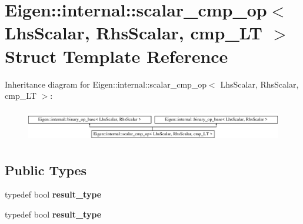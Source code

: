 \hypertarget{struct_eigen_1_1internal_1_1scalar__cmp__op_3_01_lhs_scalar_00_01_rhs_scalar_00_01cmp___l_t_01_4}{}\section{Eigen\+:\+:internal\+:\+:scalar\+\_\+cmp\+\_\+op$<$ Lhs\+Scalar, Rhs\+Scalar, cmp\+\_\+\+LT $>$ Struct Template Reference}
\label{struct_eigen_1_1internal_1_1scalar__cmp__op_3_01_lhs_scalar_00_01_rhs_scalar_00_01cmp___l_t_01_4}
Inheritance diagram for Eigen\+:\+:internal\+:\+:scalar\+\_\+cmp\+\_\+op$<$ Lhs\+Scalar, Rhs\+Scalar, cmp\+\_\+\+LT $>$\+:\begin{figure}[H]
\begin{center}
\leavevmode
\includegraphics[height=1.424936cm]{struct_eigen_1_1internal_1_1scalar__cmp__op_3_01_lhs_scalar_00_01_rhs_scalar_00_01cmp___l_t_01_4}
\end{center}
\end{figure}
\subsection*{Public Types}
\begin{DoxyCompactItemize}
\item 
\mbox{\label{struct_eigen_1_1internal_1_1scalar__cmp__op_3_01_lhs_scalar_00_01_rhs_scalar_00_01cmp___l_t_01_4_ac4efa58fb332594216a4176ee783cda7}} 
typedef bool {\bfseries result\+\_\+type}
\item 
\mbox{\label{struct_eigen_1_1internal_1_1scalar__cmp__op_3_01_lhs_scalar_00_01_rhs_scalar_00_01cmp___l_t_01_4_ac4efa58fb332594216a4176ee783cda7}} 
typedef bool {\bfseries result\+\_\+type}
\end{DoxyCompactItemize}
